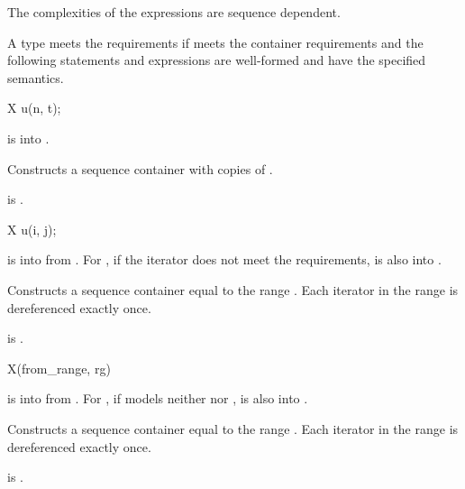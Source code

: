 \pnum
The complexities of the expressions are sequence dependent.

\renewcommand{\indexcont}[1]{%
\indexlibrarymisc{\idxcode{#1}}{sequence containers}%
\indexlibrarymemberx{deque}{#1}%
\indexlibrarymemberx{forward_list}{#1}%
\indexlibrarymemberx{list}{#1}%
\indexlibrarymemberx{vector}{#1}%
}

\pnum
A type  meets the  requirements
if  meets the container requirements and
the following statements and expressions are well-formed and have
the specified semantics.

\begin{itemdecl}
X u(n, t);
\end{itemdecl}

\begin{itemdescr}
\pnum
\expects
{} is  into .

\pnum
\effects
Constructs a sequence container with  copies of .

\pnum
\ensures
{} is .
\end{itemdescr}

\begin{itemdecl}
X u(i, j);
\end{itemdecl}

\begin{itemdescr}
\pnum
\expects
{} is  into  from .
For ,
if the iterator does not meet
the  requirements,
 is also  into .

\pnum
\effects
Constructs a sequence container equal to the range \tcode{[i, j)}.
Each iterator in the range  is dereferenced exactly once.

\pnum
\ensures
{} is .
\end{itemdescr}

\begin{itemdecl}
X(from_range, rg)
\end{itemdecl}

\begin{itemdescr}
\pnum
\expects
{} is  into 
from .
For ,
if  models
neither  nor ,
 is also  into .

\pnum
\effects
Constructs a sequence container equal to the range .
Each iterator in the range  is dereferenced exactly once.

\pnum
\ensures
{} is .
\end{itemdescr}


